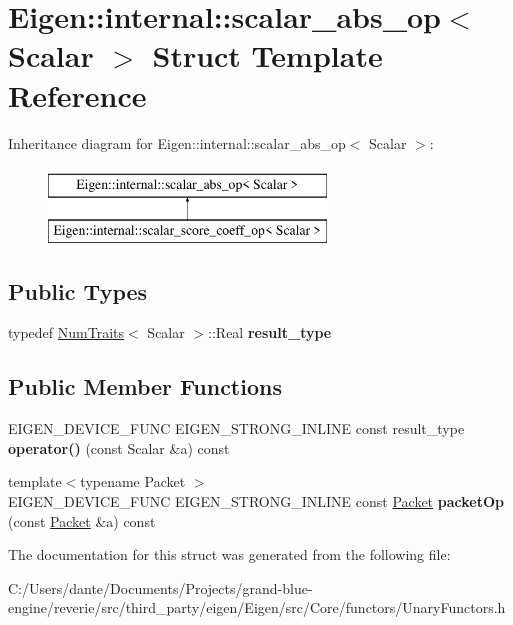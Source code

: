 \hypertarget{struct_eigen_1_1internal_1_1scalar__abs__op}{}\section{Eigen\+::internal\+::scalar\+\_\+abs\+\_\+op$<$ Scalar $>$ Struct Template Reference}
\label{struct_eigen_1_1internal_1_1scalar__abs__op}
Inheritance diagram for Eigen\+::internal\+::scalar\+\_\+abs\+\_\+op$<$ Scalar $>$\+:\begin{figure}[H]
\begin{center}
\leavevmode
\includegraphics[height=2.000000cm]{struct_eigen_1_1internal_1_1scalar__abs__op}
\end{center}
\end{figure}
\subsection*{Public Types}
\begin{DoxyCompactItemize}
\item 
\mbox{\label{struct_eigen_1_1internal_1_1scalar__abs__op_a0ba5cca2271250a406faf6f1ca904450}} 
typedef \mbox{\hyperlink{struct_eigen_1_1_num_traits}{Num\+Traits}}$<$ Scalar $>$\+::Real {\bfseries result\+\_\+type}
\end{DoxyCompactItemize}
\subsection*{Public Member Functions}
\begin{DoxyCompactItemize}
\item 
\mbox{\label{struct_eigen_1_1internal_1_1scalar__abs__op_a2e1557e18aea6d7b6a9b4b2cead03037}} 
E\+I\+G\+E\+N\+\_\+\+D\+E\+V\+I\+C\+E\+\_\+\+F\+U\+NC E\+I\+G\+E\+N\+\_\+\+S\+T\+R\+O\+N\+G\+\_\+\+I\+N\+L\+I\+NE const result\+\_\+type {\bfseries operator()} (const Scalar \&a) const
\item 
\mbox{\label{struct_eigen_1_1internal_1_1scalar__abs__op_a78ce4b55dd461fb7b58f7ead3544d37c}} 
{\footnotesize template$<$typename Packet $>$ }\\E\+I\+G\+E\+N\+\_\+\+D\+E\+V\+I\+C\+E\+\_\+\+F\+U\+NC E\+I\+G\+E\+N\+\_\+\+S\+T\+R\+O\+N\+G\+\_\+\+I\+N\+L\+I\+NE const \mbox{\hyperlink{union_eigen_1_1internal_1_1_packet}{Packet}} {\bfseries packet\+Op} (const \mbox{\hyperlink{union_eigen_1_1internal_1_1_packet}{Packet}} \&a) const
\end{DoxyCompactItemize}


The documentation for this struct was generated from the following file\+:\begin{DoxyCompactItemize}
\item 
C\+:/\+Users/dante/\+Documents/\+Projects/grand-\/blue-\/engine/reverie/src/third\+\_\+party/eigen/\+Eigen/src/\+Core/functors/Unary\+Functors.\+h\end{DoxyCompactItemize}

